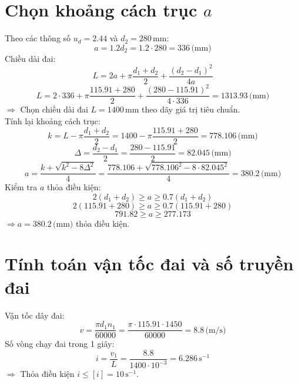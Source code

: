 \section{Chọn khoảng cách trục $a$}
Theo các thông số $u_d = 2.44$ và $d_2 = 280 \, \text{mm}$:
\begin{equation}
    a = 1.2d_2 = 1.2 \cdot 280 = 336 \, \text{(mm)}
\end{equation}
Chiều dài đai:
\begin{equation}
    L = 2a + \pi \frac{d_1 + d_2}{2} + \frac{(d_2 - d_1)^2}{4a}
\end{equation}
\[
    L = 2 \cdot 336 + \pi \frac{115.91 + 280}{2} + \frac{(280 - 115.91)^2}{4 \cdot 336} = 1313.93 \, \text{(mm)}
\]
$\Rightarrow$ Chọn chiều dài đai $L = 1400 \, \text{mm}$ theo dãy giá trị tiêu chuẩn.\\
Tính lại khoảng cách trục:
\begin{equation}
    k = L - \pi \frac{d_1 + d_2}{2} = 1400 - \pi \frac{115.91 + 280}{2} = 778.106 \, \text{(mm)}
\end{equation}
\begin{equation}
    \Delta = \frac{d_2 - d_1}{2} = \frac{280 - 115.91}{2} = 82.045 \, \text{(mm)}
\end{equation}
\begin{equation}
    a = \frac{k + \sqrt{k^2 - 8\Delta^2}}{4} = \frac{778.106 + \sqrt{778.106^2 - 8 \cdot 82.045^2}}{4} = 380.2 \, \text{(mm)}
\end{equation}
Kiểm tra $a$ thỏa điều kiện:
\begin{equation}
    2(d_1 + d_2) \geq a \geq 0.7(d_1 + d_2)
\end{equation}
\[
    2(115.91 + 280) \geq a \geq 0.7(115.91 + 280)
\]
\[
    791.82 \geq a \geq 277.173
\]
$\Rightarrow a = 380.2 \, \text{(mm)}$ thỏa điều kiện. \\

\section{Tính toán vận tốc đai và số truyền đai}
Vận tốc dây đai:
\begin{equation}
    v = \frac{\pi d_1 n_1}{60000} = \frac{\pi \cdot 115.91 \cdot 1450}{60000} = 8.8 \, \text{(m/s)}
\end{equation}
Số vòng chạy đai trong 1 giây:
\begin{equation}
    i = \frac{v_1}{L} = \frac{8.8}{1400 \cdot 10^{-3}} = 6.286 \, \text{s}^{-1}
\end{equation}
$\Rightarrow$ Thỏa điều kiện $i \leq [i] = 10 \, \text{s}^{-1}$. \\

